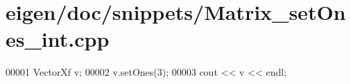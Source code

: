\hypertarget{eigen_2doc_2snippets_2_matrix__set_ones__int_8cpp_source}{}\section{eigen/doc/snippets/\+Matrix\+\_\+set\+Ones\+\_\+int.cpp}
\label{eigen_2doc_2snippets_2_matrix__set_ones__int_8cpp_source}

\begin{DoxyCode}
00001 VectorXf v;
00002 v.setOnes(3);
00003 cout << v << endl;
\end{DoxyCode}

